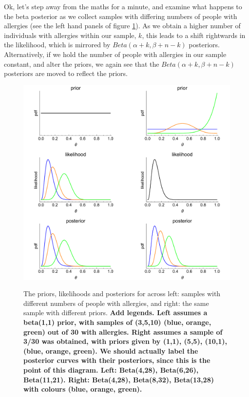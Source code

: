 \documentclass[11pt,fullpage]{book}
\begin{document}
Ok, let's step away from the maths for a minute, and examine what happens to the beta posterior as we collect samples with differing numbers of people with allergies (see the left hand panels of figure \ref{fig:Conjugate_binomial}). As we obtain a higher number of individuals with allergies within our sample, $k$, this leads to a shift rightwards in the likelihood, which is mirrored by $Beta(\alpha + k,\beta + n - k)$ posteriors. Alternatively, if we hold the number of people with allergies in our sample constant, and alter the priors, we again see that the $Beta(\alpha + k,\beta + n - k)$ posteriors are moved to reflect the priors.

\begin{figure}
\centering
\scalebox{0.3} 
{\includegraphics{Conjugate_binomial.pdf}}
\caption{The priors, likelihoods and posteriors for across left: samples with different numbers of people with allergies, and right: the same sample with different priors. \textbf{Add legends. Left assumes a beta(1,1) prior, with samples of (3,5,10) (blue, orange, green) out of 30 with allergies. Right assumes a sample of 3/30 was obtained, with priors given by (1,1), (5,5), (10,1), (blue, orange, green). We should actually label the posterior curves with their posteriors, since this is the point of this diagram. Left: Beta(4,28), Beta(6,26), Beta(11,21). Right: Beta(4,28), Beta(8,32), Beta(13,28) with colours (blue, orange, green).}}\label{fig:Conjugate_binomial}
\end{figure}
\end{document}
